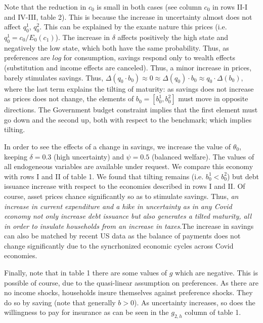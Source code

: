 \documentclass[11pt,letterpaper]{article}
\begin{document}
Note that the reduction in $c_0$ is small in both cases (see column $c_0$ in rows II-I and IV-III, table 2). This is because the increase in uncertainty almost does not affect $q^{1}_{0}$, $q^{2}_{0}$. This can be explained by the exante nature this prices (i.e. $q^{1}_{0}=c_0/E_0(c_1)$). The increase in $\delta$ affects positively the high state and negatively the low state, which both have the same probability. Thus, as preferences are $log$ for consumption, savings respond only to wealth effects (substitution and income effects are canceled). Thus, a minor increase in prices, barely stimulates savings. Thus, $\Delta \left ( q_0\cdot b_0 \right )\approx  0 \approx \Delta (q_0) \cdot b_0 \approx q_0 \cdot \Delta ( b_0)$, where the last term explains the tilting of maturity: as savings does not increase as prices does not change, the elements of $b_0=[b_0^1, b_0^2]$ must move in opposite directions. The Government budget constraint implies that the first element must go down and the second up, both with respect to the benchmark; which implies tilting.

\bigskip

In order to see the effects of a change in savings, we increase the value of $\theta_0$, keeping $\delta=0.3$ (high uncertainty) and $\psi=0.5$ (balanced welfare). The values of all endogeneous variables are available under request. We compare this economy with rows I and II of table 1. We found that tilting remains (i.e. $b_{0}^{1} <b_{0}^{2}$) but debt issuance increase with respect to the economies described in rows I and II. Of course, asset prices chance significantly so as to stimulate savings. Thus, \textit{an increase in current expenditure and a hike in uncertainty as in any Covid economy not only increase debt issuance but also generates a tilted maturity, all in order to insulate households from an increase in taxes}.The increase in savings can also be matched by recent US data as the balance of payments does not change significantly due to the syncrhonized economic cycles across Covid economies.

\bigskip

Finally, note that in table 1 there are some values of $g$ which are negative. This is possible of course, due to the quasi-linear assumption on preferences. As there are no income shocks, households insure themselves against preference shocks. They do so by saving (note that generally $b>0$). As uncertainty increases, so does the willingness to pay for insurance as can be seen in the $g_{2,h}$ column of table 1.





\end{document}
